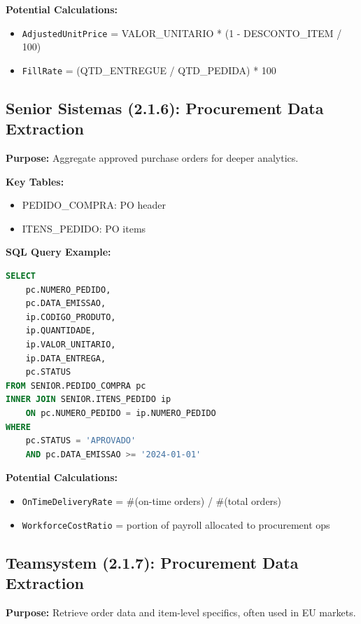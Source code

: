 \documentclass[a4paper,10pt]{article}
\begin{document}
\textbf{Potential Calculations:}
\begin{itemize}[leftmargin=2em]
    \item \texttt{AdjustedUnitPrice} = VALOR\_UNITARIO * (1 - DESCONTO\_ITEM / 100)
    \item \texttt{FillRate} = (QTD\_ENTREGUE / QTD\_PEDIDA) * 100
\end{itemize}

\subsection{Senior Sistemas (2.1.6): Procurement Data Extraction}
\textbf{Purpose:} Aggregate approved purchase orders for deeper analytics.

\textbf{Key Tables:}
\begin{itemize}[leftmargin=2em]
    \item PEDIDO\_COMPRA: PO header
    \item ITENS\_PEDIDO: PO items
\end{itemize}

\textbf{SQL Query Example:}
\begin{lstlisting}[language=SQL]
SELECT
    pc.NUMERO_PEDIDO,
    pc.DATA_EMISSAO,
    ip.CODIGO_PRODUTO,
    ip.QUANTIDADE,
    ip.VALOR_UNITARIO,
    ip.DATA_ENTREGA,
    pc.STATUS
FROM SENIOR.PEDIDO_COMPRA pc
INNER JOIN SENIOR.ITENS_PEDIDO ip
    ON pc.NUMERO_PEDIDO = ip.NUMERO_PEDIDO
WHERE
    pc.STATUS = 'APROVADO'
    AND pc.DATA_EMISSAO >= '2024-01-01'
\end{lstlisting}

\textbf{Potential Calculations:}
\begin{itemize}[leftmargin=2em]
    \item \texttt{OnTimeDeliveryRate} = \#(on-time orders) / \#(total orders)
    \item \texttt{WorkforceCostRatio} = portion of payroll allocated to procurement ops
\end{itemize}

\subsection{Teamsystem (2.1.7): Procurement Data Extraction}
\textbf{Purpose:} Retrieve order data and item-level specifics, often used in EU markets.
\end{document}
